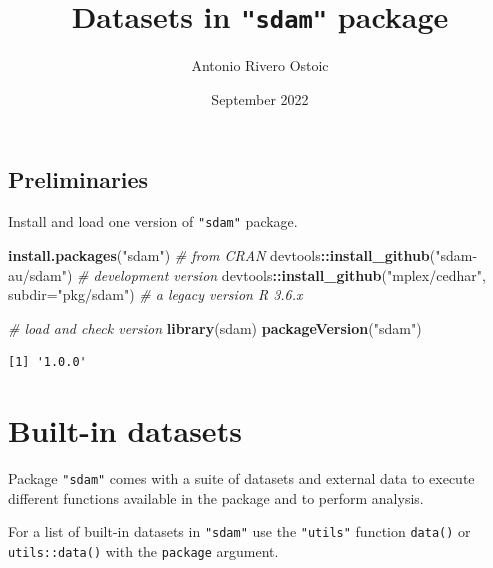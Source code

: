 \documentclass[a4paper,11pt]{memoir}
\title{Datasets in \texttt{"sdam"} package}
\author{Antonio Rivero Ostoic}
\date{September 2022}
\newenvironment{Shaded}{\begin{snugshade}}{\end{snugshade}}
\newcommand{\CommentTok}[1]{\textcolor[rgb]{0.56,0.35,0.01}{\textit{#1}}}
\newcommand{\DataTypeTok}[1]{\textcolor[rgb]{0.13,0.29,0.53}{#1}}
\newcommand{\KeywordTok}[1]{\textcolor[rgb]{0.13,0.29,0.53}{\textbf{#1}}}
\newcommand{\NormalTok}[1]{#1}
\newcommand{\OperatorTok}[1]{\textcolor[rgb]{0.81,0.36,0.00}{\textbf{#1}}}
\newcommand{\StringTok}[1]{\textcolor[rgb]{0.31,0.60,0.02}{#1}}
\begin{document}
\maketitle

\hypertarget{preliminaries}{%
\subsection{Preliminaries}\label{preliminaries}}

Install and load one version of \texttt{"sdam"} package.

\begin{Shaded}
\begin{Highlighting}[]
\KeywordTok{install.packages}\NormalTok{(}\StringTok{"sdam"}\NormalTok{) }\CommentTok{# from CRAN}
\NormalTok{devtools}\OperatorTok{::}\KeywordTok{install_github}\NormalTok{(}\StringTok{"sdam-au/sdam"}\NormalTok{) }\CommentTok{# development version}
\NormalTok{devtools}\OperatorTok{::}\KeywordTok{install_github}\NormalTok{(}\StringTok{"mplex/cedhar"}\NormalTok{, }\DataTypeTok{subdir=}\StringTok{"pkg/sdam"}\NormalTok{) }\CommentTok{# a legacy version R 3.6.x}
\end{Highlighting}
\end{Shaded}

\begin{Shaded}
\begin{Highlighting}[]
\CommentTok{# load and check version}
\KeywordTok{library}\NormalTok{(sdam)}
\KeywordTok{packageVersion}\NormalTok{(}\StringTok{"sdam"}\NormalTok{)}
\end{Highlighting}
\end{Shaded}

\begin{verbatim}
[1] '1.0.0'
\end{verbatim}

\hypertarget{built-in-datasets}{%
\section{Built-in datasets}\label{built-in-datasets}}

Package \texttt{"sdam"} comes with a suite of datasets and external data
to execute different functions available in the package and to perform
analysis.

For a list of built-in datasets in \texttt{"sdam"} use the
\texttt{"utils"} function \texttt{data()} or \texttt{utils::data()} with
the \texttt{\textquotesingle{}package\textquotesingle{}} argument.
\end{document}
